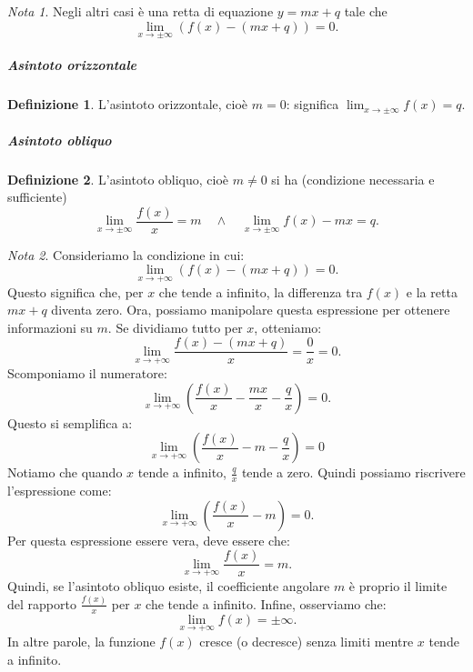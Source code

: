 \documentclass{article}
\theoremstyle{plain}
\theoremstyle{definition}
\newtheorem{defn}{Definizione}[section]
\theoremstyle{remark}
\newtheorem{note}{Nota}
\begin{document}
\vspace{10pt}

\begin{note}
    Negli altri casi è una retta di equazione $y=mx+q$ tale che \[\lim_{x\to\pm\infty}(f(x)-(mx+q))=0.\]
\end{note}

\vspace{10pt}

\subparagraph{Asintoto orizzontale}
\begin{bxthm}
\begin{defn}
    L'asintoto orizzontale, cioè $m=0$: significa $\lim_{x\to\pm\infty}f(x)=q$.
\end{defn}
\end{bxthm}

\vspace{10pt}

\subparagraph{Asintoto obliquo}
\begin{bxthm}
\begin{defn}
    L'asintoto obliquo, cioè $m\neq0$ si ha (condizione necessaria e sufficiente) 
    \[\lim_{x\to\pm\infty}\dfrac{f(x)}{x}=m\quad\land\quad\lim_{x\to\pm\infty}f(x)-mx=q.\]
\end{defn}
\end{bxthm}

\vspace{10pt}

\begin{note}
    Consideriamo la condizione in cui:
    \[
    \lim_{x\to+\infty} (f(x) - (mx + q))=0.
    \]
    Questo significa che, per \(x\) che tende a infinito, la differenza tra \(f(x)\) e la retta \(mx + q\) diventa zero.
    Ora, possiamo manipolare questa espressione per ottenere informazioni su \(m\). Se dividiamo tutto per \(x\), otteniamo:
    \[
    \lim_{x\to+\infty} \frac{f(x) - (mx + q)}{x}=\dfrac{0}{x}=0.
    \]
    Scomponiamo il numeratore:
    \[
    \lim_{x\to+\infty} \left( \frac{f(x)}{x} - \frac{mx}{x} - \frac{q}{x} \right)=0.
    \]
    Questo si semplifica a:
    \[
    \lim_{x\to+\infty} \left( \frac{f(x)}{x} - m - \frac{q}{x} \right)=0
    \]
    Notiamo che quando \(x\) tende a infinito, \(\frac{q}{x}\) tende a zero. Quindi possiamo riscrivere l'espressione come:
    \[
    \lim_{x\to+\infty} \left( \frac{f(x)}{x} - m \right)=0.
    \]
    Per questa espressione essere vera, deve essere che:
    \[
    \lim_{x\to+\infty} \frac{f(x)}{x} = m.
    \]
    Quindi, se l'asintoto obliquo esiste, il coefficiente angolare \(m\) è proprio il limite del rapporto \(\frac{f(x)}{x}\) per \(x\) che tende a infinito. Infine, osserviamo che:
    \[
    \lim_{x\to+\infty} f(x) = \pm\infty.
    \]
    In altre parole, la funzione \(f(x)\) cresce (o decresce) senza limiti mentre \(x\) tende a infinito.
\end{note}
\end{document}
